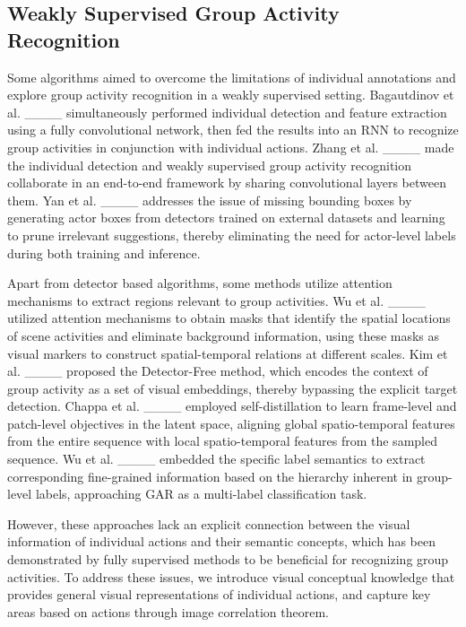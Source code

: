 \subsection{Weakly Supervised Group Activity Recognition}
Some algorithms aimed to overcome the limitations of individual annotations and explore group activity recognition in a weakly supervised setting.
Bagautdinov et al. ____ simultaneously performed individual detection and feature extraction using a fully convolutional network, then fed the results into an RNN to recognize group activities in conjunction with individual actions.
Zhang et al. ____ made the individual detection and weakly supervised group activity recognition collaborate in an end-to-end framework by sharing convolutional layers between them.
Yan et al. ____ addresses the issue of missing bounding boxes by generating actor boxes from detectors trained on external datasets and learning to prune irrelevant suggestions, thereby eliminating the need for actor-level labels during both training and inference. 

Apart from detector based algorithms, some methods utilize attention mechanisms to extract regions relevant to group activities.
Wu et al. ____ utilized attention mechanisms to obtain masks that identify the spatial locations of scene activities and eliminate background information, using these masks as visual markers to construct spatial-temporal relations at different scales.
Kim et al. ____ proposed the Detector-Free method, which encodes the context of group activity as a set of visual embeddings, thereby bypassing the explicit target detection. 
Chappa et al. ____ employed self-distillation to learn frame-level and patch-level objectives in the latent space, aligning global spatio-temporal features from the entire sequence with local spatio-temporal features from the sampled sequence.
Wu et al. ____ embedded the specific label semantics to extract corresponding fine-grained information based on the hierarchy inherent in group-level labels, approaching GAR as a multi-label classification task.

However, these approaches lack an explicit connection between the visual information of individual actions and their semantic concepts, which has been demonstrated by fully supervised methods to be beneficial for recognizing group activities. 
To address these issues, we introduce visual conceptual knowledge that provides general visual representations of individual actions, and capture key areas based on actions through image correlation theorem.